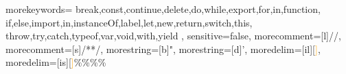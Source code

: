  {
	morekeywords={
		break,const,continue,delete,do,while,export,for,in,function,
		if,else,import,in,instanceOf,label,let,new,return,switch,this,
		throw,try,catch,typeof,var,void,with,yield
	},
	sensitive=false,
	morecomment=[l]{//},
	morecomment=[s]{/*}{*/},
	morestring=[b]",
	morestring=[d]',
	moredelim=[il][\textcolor{orange}]{$$},
	moredelim=[is][\textcolor{orange}]{\%\%}{\%\%}
}

